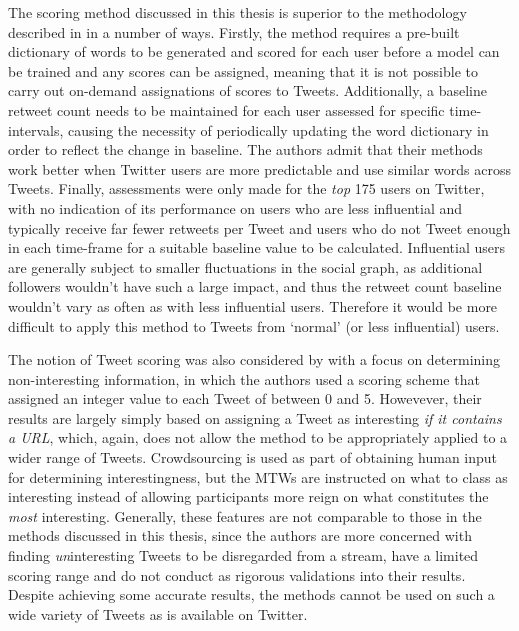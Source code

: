 The scoring method discussed in this thesis is superior to the methodology described in \cite{gransee12} in a number of ways. Firstly, the method requires a pre-built dictionary of words to be generated and scored for each user before a model can be trained and any scores can be assigned, meaning that it is not possible to carry out on-demand assignations of scores to Tweets. Additionally, a baseline retweet count needs to be maintained for each user assessed for specific time-intervals, causing the necessity of periodically updating the word dictionary in order to reflect the change in baseline. The authors admit that their methods work better when Twitter users are more predictable and use similar words across Tweets. Finally, assessments were only made for the \textit{top} 175 users on Twitter, with no indication of its performance on users who are less influential and typically receive far fewer retweets per Tweet and users who do not Tweet enough in each time-frame for a suitable baseline value to be calculated. Influential users are generally subject to smaller fluctuations in the social graph, as additional followers wouldn't have such a large impact, and thus the retweet count baseline wouldn't vary as often as with less influential users. Therefore it would be more difficult to apply this method to Tweets from `normal' (or less influential) users.

The notion of Tweet scoring was also considered by \cite{alonso10} with a focus on determining non-interesting information, in which the authors used a scoring scheme that assigned an integer value to each Tweet of between 0 and 5. Howevever, their results are largely simply based on assigning a Tweet as interesting \textit{if it contains a URL}, which, again, does not allow the method to be appropriately applied to a wider range of Tweets. Crowdsourcing is used as part of obtaining human input for determining interestingness, but the MTWs are instructed on what to class as interesting instead of allowing participants more reign on what constitutes the \textit{most} interesting. Generally, these features are not comparable to those in the methods discussed in this thesis, since the authors are more concerned with finding \textit{un}interesting Tweets to be disregarded from a stream, have a limited scoring range and do not conduct as rigorous validations into their results. Despite achieving some accurate results, the methods cannot be used on such a wide variety of Tweets as is available on Twitter.

